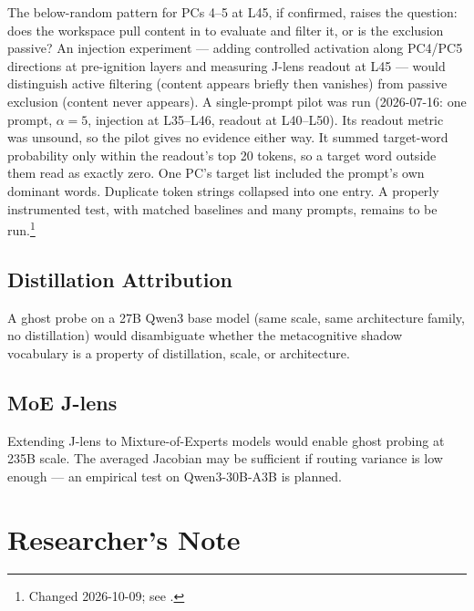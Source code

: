 \documentclass[11pt,a4paper]{article}
\begin{document}
The below-random pattern for PCs 4--5 at L45, if confirmed, raises the question: does the workspace pull content in to evaluate and filter it, or is the exclusion passive? An injection experiment --- adding controlled activation along PC4/PC5 directions at pre-ignition layers and measuring J-lens readout at L45 --- would distinguish active filtering (content appears briefly then vanishes) from passive exclusion (content never appears). A single-prompt pilot was run (2026-07-16: one prompt, $\alpha = 5$, injection at L35--L46, readout at L40--L50). Its readout metric was unsound, so the pilot gives no evidence either way. It summed target-word probability only within the readout's top 20 tokens, so a target word outside them read as exactly zero. One PC's target list included the prompt's own dominant words. Duplicate token strings collapsed into one entry. A properly instrumented test, with matched baselines and many prompts, remains to be run.\footnote{Changed 2026-10-09; see .}

\subsection{Distillation Attribution}

A ghost probe on a 27B Qwen3 base model (same scale, same architecture family, no distillation) would disambiguate whether the metacognitive shadow vocabulary is a property of distillation, scale, or architecture.

\subsection{MoE J-lens}

Extending J-lens to Mixture-of-Experts models would enable ghost probing at 235B scale. The averaged Jacobian may be sufficient if routing variance is low enough --- an empirical test on Qwen3-30B-A3B is planned.

\section*{Researcher's Note}
\end{document}

